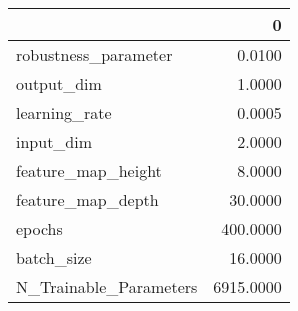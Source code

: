 \begin{tabular}{lr}
\toprule
{} &          0 \\
\midrule
robustness\_parameter   &     0.0100 \\
output\_dim             &     1.0000 \\
learning\_rate          &     0.0005 \\
input\_dim              &     2.0000 \\
feature\_map\_height     &     8.0000 \\
feature\_map\_depth      &    30.0000 \\
epochs                 &   400.0000 \\
batch\_size             &    16.0000 \\
N\_Trainable\_Parameters &  6915.0000 \\
\bottomrule
\end{tabular}
